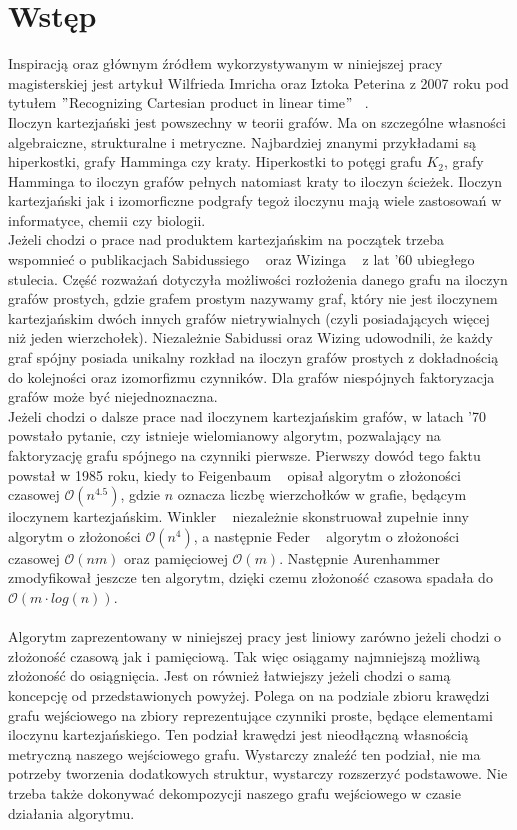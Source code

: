 \documentclass[12pt,a4paper,titlepage]{article}
\newcommand\tab[1][1cm]{\hspace*{#1}}
\begin{document}
\section{Wstęp}

Inspiracją oraz głównym źródłem wykorzystywanym w niniejszej pracy magisterskiej jest artykuł Wilfrieda Imricha oraz Iztoka Peterina z 2007 roku pod tytułem $"$Recognizing Cartesian product in linear time$"$ ~\cite{MAIN}. \\

Iloczyn kartezjański jest powszechny w teorii grafów. Ma on szczególne własności algebraiczne, strukturalne i metryczne. Najbardziej znanymi przykładami są hiperkostki, grafy Hamminga czy kraty. Hiperkostki to potęgi grafu $K_2$, grafy Hamminga to iloczyn grafów pełnych natomiast kraty to iloczyn ścieżek. Iloczyn kartezjański jak i izomorficzne podgrafy tegoż iloczynu mają wiele zastosowań w informatyce, chemii czy biologii.\\
\tab[0.6cm]Jeżeli chodzi o prace nad produktem kartezjańskim na początek trzeba wspomnieć o publikacjach Sabidussiego ~\cite{SAB} oraz Wizinga ~\cite{VIS} z lat '60 ubiegłego stulecia. Część rozważań dotyczyła możliwości rozłożenia danego grafu na iloczyn grafów prostych, gdzie grafem prostym nazywamy graf, który nie jest iloczynem kartezjańskim dwóch innych grafów nietrywialnych (czyli posiadających więcej niż jeden wierzchołek). Niezależnie Sabidussi oraz Wizing udowodnili, że każdy graf spójny posiada unikalny rozkład na iloczyn grafów prostych z dokładnością do kolejności oraz izomorfizmu czynników. Dla grafów niespójnych faktoryzacja grafów może być niejednoznaczna.\\
\tab[0.6cm]Jeżeli chodzi o dalsze prace nad iloczynem kartezjańskim grafów, w latach '70 powstało pytanie, czy istnieje wielomianowy algorytm, pozwalający na faktoryzację grafu spójnego na czynniki pierwsze. Pierwszy dowód tego faktu powstał w 1985 roku, kiedy to Feigenbaum ~\cite{FEI} opisał algorytm o złożoności czasowej $\mathcal{O} (n^{4.5})$, gdzie $n$ oznacza liczbę wierzchołków w grafie, będącym iloczynem kartezjańskim. Winkler ~\cite{WIN} niezależnie skonstruował zupełnie inny algorytm o złożoności $\mathcal{O} (n^{4})$, a następnie Feder ~\cite{FED} algorytm o złożoności czasowej $\mathcal{O} (nm)$ oraz pamięciowej $\mathcal{O} (m)$. Następnie Aurenhammer ~\cite{AUR} zmodyfikował jeszcze ten algorytm, dzięki czemu złożoność czasowa spadała do $\mathcal{O} (m\cdot log (n))$.\\
\\
\tab[0.6cm]Algorytm zaprezentowany w niniejszej pracy jest liniowy zarówno jeżeli chodzi o złożoność czasową jak i pamięciową. Tak więc osiągamy najmniejszą możliwą złożoność do osiągnięcia. Jest on również łatwiejszy jeżeli chodzi o samą koncepcję od przedstawionych powyżej. Polega on na podziale zbioru krawędzi grafu wejściowego na zbiory reprezentujące czynniki proste, będące elementami iloczynu kartezjańskiego. Ten podział krawędzi jest nieodłączną własnością metryczną naszego wejściowego grafu. Wystarczy znaleźć ten podział, nie ma potrzeby tworzenia dodatkowych struktur, wystarczy rozszerzyć podstawowe. Nie trzeba także dokonywać dekompozycji naszego grafu wejściowego w czasie działania algorytmu. \\
\end{document}
